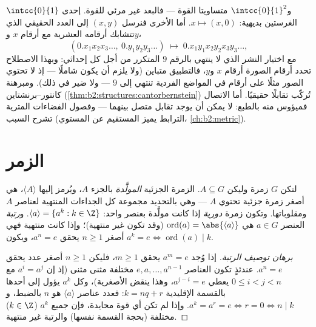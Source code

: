 \begin{example}\label{ex:b2:structures:squareseg}
$\intcc{0}{1}$ و$\intcc{0}{1}^2$ متساويتا القوة --- فالبعد غير مرئي
للقوة. إحدى الغرستين بديهية: $x
\mapsto (x, 0)$. أما الأخرى فنرسل $(x, y)$
إلى العدد الحقيقي الذي تتشابك أرقامه العشرية مع أرقام $x$ و$y$،
\[
(0.x_1x_2x_3\dots,\ 0.y_1y_2y_3\dots)
\;\longmapsto\; 0.x_1y_1x_2y_2x_3y_3\dots,
\]
مع اختيار النشر الذي لا ينتهي بالرقم $9$ المتكرر من أجل كل إحداثي:
وبهذا الاصطلاح تحدد أرقام الصورة أرقام $x$ و$y$، فالتطبيق
متباين (ولا يلزم أن يكون شاملًا --- إذ لا تحتوي الصور مثلًا على
أرقام في المواضع الفردية تنتهي إلى $9$ --- ولا ضير في ذلك).
ومبرهنة كانتور--برنشتاين (\cref{thm:b2:structures:cantorbernstein})
تُركّب تقابلًا حقيقيًا. أما الاتصال فميؤوس منه بالطبع: لا يمكن أن
يوجد تقابل متصل بينهما --- وفصول الفضاءات المترية تشرح السبب
(الترابط يميز المستقيم عن المستوي، \cref{ch:b2:metric}).
\end{example}

\section{الزمر}

\begin{definition}\label{def:b2:structures:generated}
لتكن $G$ زمرة وليكن $A \subseteq G$. الزمرة الجزئية \emph{المولَّدة}
بالجزء $A$، ويُرمز إليها $\langle A \rangle$، هي أصغر زمرة جزئية
تحتوي $A$ --- وهي بالتحديد مجموعة كل الجداءات المنتهية لعناصر $A$
ومقلوباتها. وتكون زمرة \emph{دورية} إذا كانت
مولَّدة بعنصر واحد: $\langle a\rangle = \{a^k : k \in \Z\}$.
و\emph{رتبة} العنصر $a \in G$ هي
$\operatorname{ord}(a) = \abs{\langle a \rangle}$ (وقد تكون
غير منتهية)؛ وإذا كانت منتهية فهي أصغر $n \geq 1$ يحقق $a^n = e$،
ويكون $a^k = e \iff \operatorname{ord}(a) \mid k$.
\end{definition}

\begin{proof}[برهان توصيف الرتبة]
إذا وُجد $a^m = e$ يحقق $m \geq 1$، فليكن $n \geq 1$ أصغر عدد يحقق $a^n
= e$. عندئذٍ تكون العناصر $e, a, \dots, a^{n-1}$ مختلفة مثنى مثنى
(إذ إن $a^{i} = a^{j}$ مع $0 \leq i < j < n$ يعطي $a^{j-i} = e$،
وهذا ينقض الأصغرية)، وكل $a^k$ يؤول إلى أحدها بالقسمة الإقليدية
$k = nq + r$: فعدد عناصر $\langle a\rangle$ هو $n$ بالضبط، و$a^k = a^r = e \iff r = 0 \iff n \mid k$. وإذا لم تكن أي قوة
محايدة، فإن جميع $a^k$ ($k \in \Z$) مختلفة (بحجة القسمة نفسها)
والرتبة غير منتهية.
\end{proof}


